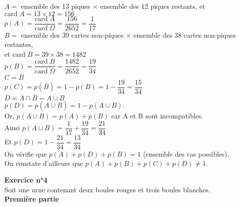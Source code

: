 $ A = $ ensemble des 13 piques $ \times $ ensemble des 12 piques restants, et $\mathrm{card} \; A = 13 \times 12 = 156 $ \\

$ p\left(A\right) = \dfrac{\mathrm{card} \; A}{\mathrm{card} \; \Omega} = \dfrac{156}{2652} = \dfrac{1}{17} $ \\

$ B = $ ensemble des 39 cartes non-piques $ \times $ ensemble des 38 cartes non-piques restantes, \\ et $\mathrm{card} \; B = 39 \times 38 = 1482 $ \\

$ p\left(B\right) = \dfrac{\mathrm{card} \; B}{\mathrm{card} \; \Omega} = \dfrac{1482}{2652} = \dfrac{19}{34} $ \\

$ C = \overline{B} $ \\

$ p\left(C\right) = p\left(\overline{B} \right) = 1 - p\left(B\right) = 1 - \dfrac{19}{34} = \dfrac{15}{34} $ \\

$ D = \overline{A} \cap \overline{B} = \overline{A \cup B} $ \\

$ p\left(D\right) = p\left(\overline{A\cup B}\right) = 1 - p\left(A\cup B\right)$.  \\

Or, $p\left(A\cup B\right) = p\left(A\right) + p\left(B\right) $ car A et B sont incompatibles. \\

Ainsi $p\left(A\cup B\right) = \dfrac{1}{17} + \dfrac{19}{34} = \dfrac{21}{34} $ \\

Et $p\left(D\right) = 1 - \dfrac{21}{34} = \dfrac{13}{34} $ \\

On vérifie que $p\left(A\right) + p\left(D\right) + p\left(B\right) = 1$ (ensemble des cas possibles). \\ On constate d'ailleurs que $p\left(A\right) + p\left(B\right) + p\left(C\right) + p\left(D\right) \neq 1 $.

\newpage

\textbf{Exercice n°4} \\

Soit une urne contenant deux boules rouges et trois boules blanches. \\

\textbf{Première partie} \\

